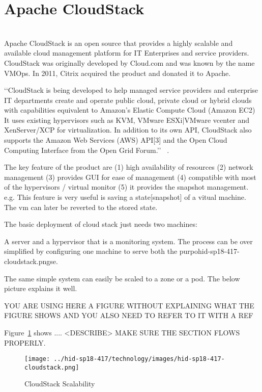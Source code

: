 
\section{Apache CloudStack}
\\

Apache CloudStack is an open source that provides a highly scalable and available 
cloud management platform for IT
Enterprises and service providers. CloudStack was originally developed by 
Cloud.com and was known by the name VMOps. 
In 2011, Citrix acquired the product and donated it to Apache. 

‘‘CloudStack is being developed to help managed service providers and enterprise IT 
departments create and operate public cloud, private cloud or hybrid clouds
with capabilities equivalent to Amazon's Elastic Compute Cloud (Amazon EC2)
It uses existing hypervisors such as KVM, VMware ESXi|VMware vcenter and
XenServer/XCP for virtualization. In addition to its own API, CloudStack 
also supports the Amazon Web Services (AWS) API[3] and the Open Cloud 
Computing Interface from the Open Grid Forum.’’  
~\cite{ hid-sp18-417-wiki-cloudStack}. 

The key feature of the product are 
(1) high availability of resources
(2) network management
(3) provides GUI for ease of management
(4) compatible with most of the hypervisors / virtual monitor
(5) it provides the snapshot management. e.g. This feature is 
very useful is saving a state[snapshot] of a vitual machine. 
The vm can later be reverted to the stored state.  

 The basic deployment of cloud stack just needs two machines: 
 
 A server and a hypervisor that is a monitoring system. 
 The process can be over simplified by configuring one machine 
 to serve both the purpohid-sp18-417-cloudstack.pngse. 
 
 The same simple system can easily be scaled to a zone or a pod.
 The below picture explains it well.

YOU ARE USING HERE A FIGURE WITHOUT EXPLAINING WHAT THE FIGURE 
SHOWS AND YOU ALSO NEED TO REFER TO IT WITH A REF

Figure~\ref{F:cloudstack-scalabuility} shows .... 
<DESCRIBE> MAKE SURE THE SECTION FLOWS PROPERLY.

\begin{figure}[htb]
  \texttt{[image: ../hid-sp18-417/technology/images/hid-sp18-417-cloudstack.png]}
  \caption{CloudStack Scalability ~\cite{hid-sp18-417-cloudstack-scaling}}
  \label{F:cloudstack-scalabuility}
\end{figure}

